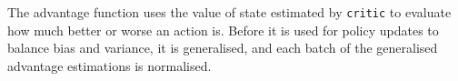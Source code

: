 \documentclass{article}
\begin{document}











The advantage function uses the value of state estimated by \texttt{critic} to evaluate how much better or worse an action is. Before it is used for policy updates to balance bias and variance, it is generalised, and each batch of the generalised advantage estimations is normalised.
\end{document}
